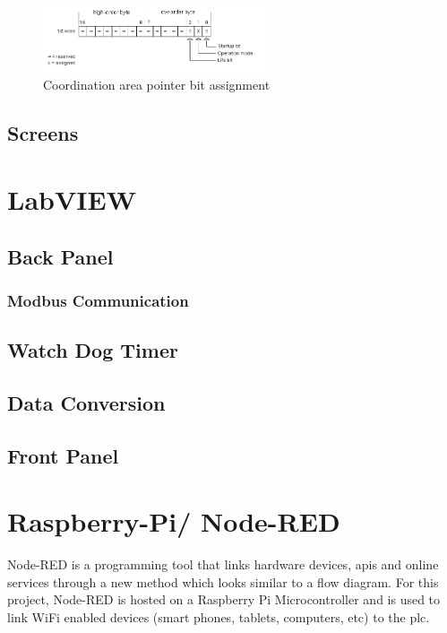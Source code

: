         \begin{figure}[H]
            \centering
            \includegraphics[width = 0.6\textwidth]{2_images/hmiCoordination}
            \caption{Coordination area pointer bit assignment}
            \label{fig:hmiAlarms}
        \end{figure} 
            

    \subsection{Screens} \label{sec:hmiScreens}
        
    
\section{LabVIEW}

    \subsection{Back Panel}

        \subsubsection{Modbus Communication}

        \subsection{Watch Dog Timer}
        
        \subsection{Data Conversion}

    \subsection{Front Panel}



\section{Raspberry-Pi/ Node-RED}
    Node-RED is a programming tool that links hardware devices, \acrshort{api}s and online services through a new method which looks similar to a flow diagram. For this project, Node-RED is hosted on a Raspberry Pi Microcontroller and is used to link WiFi enabled devices (smart phones, tablets, computers, etc) to the \acrshort{plc}.

